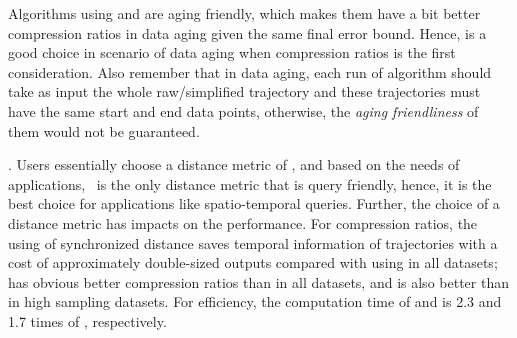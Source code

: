 {Algorithms \dpa using \ped and \sed are aging friendly, which makes them have a bit better compression ratios in data aging given the same final error bound. Hence, \dpa is a good choice in scenario of data aging when compression ratios is the first consideration. Also remember that in data aging, each run of algorithm \dpa should take as input the whole raw/simplified trajectory and these trajectories must have the same start and end data points, otherwise, the \emph{aging friendliness} of them would not be guaranteed.}

. Users essentially choose a distance metric of \ped, \sed and \dad based on the needs of applications, \eg~\sed is the only distance metric that is query friendly, hence, it is the best choice for applications like spatio-temporal queries.
%
Further, the choice of a distance metric has impacts on the performance.
For compression ratios, the using of synchronized distance \sed saves temporal information of trajectories with a cost of approximately double-sized outputs compared with using \ped in all datasets; \ped has obvious better compression ratios than \dad in all datasets, and \sed is also better than \dad in high sampling datasets.
For efficiency, the computation time of \ped and \sed is 2.3 and 1.7 times of \dad, respectively.



%
%
